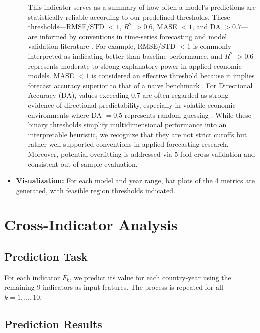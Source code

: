 \documentclass[12pt]{article}
\begin{document}
\begin{itemize}
\begin{itemize}
        This indicator serves as a summary of how often a model’s predictions are statistically reliable according to our predefined thresholds. These thresholds---RMSE/STD $< 1$, $R^2$ $> 0.6$, MASE $< 1$, and DA $> 0.7$---are informed by conventions in time-series forecasting and model validation literature \cite{Hyndman2006, Shmueli2016, Goodwin1993, Kim2016}. For example, RMSE/STD $< 1$ is commonly interpreted as indicating better-than-baseline performance, and $R^2$ $> 0.6$ represents moderate-to-strong explanatory power in applied economic models. MASE $< 1$ is considered an effective threshold because it implies forecast accuracy superior to that of a naive benchmark \cite{Hyndman2006}. For Directional Accuracy (DA), values exceeding 0.7 are often regarded as strong evidence of directional predictability, especially in volatile economic environments where DA $= 0.5$ represents random guessing \cite{Goodwin1993, Kim2016}. While these binary thresholds simplify multidimensional performance into an interpretable heuristic, we recognize that they are not strict cutoffs but rather well-supported conventions in applied forecasting research. Moreover, potential overfitting is addressed via 5-fold cross-validation and consistent out-of-sample evaluation.
    \end{itemize}
    \item \textbf{Visualization:} For each model and year range, bar plots of the 4 metrics are generated, with feasible region thresholds indicated.
\end{itemize}

\section{Cross-Indicator Analysis}

\subsection{Prediction Task}
For each indicator $F_k$, we predict its value for each country-year using the remaining 9 indicators as input features. The process is repeated for all $k = 1, \ldots, 10$.
\subsection{Prediction Results}
\end{document}
